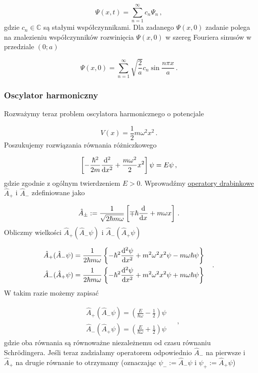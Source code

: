 \documentclass{myclass}
\begin{document}
\begin{equation*}
    \Psi(x,t)=\sum_{n=1}^\infty c_n\Psi_n\,,
\end{equation*}
gdzie \(c_n\in\mathbb{C}\) są stałymi współczynnikami. Dla zadanego \(\Psi(x,0)\) zadanie polega na
znalezieniu współczynników rozwinięcia \(\Psi(x,0)\) w szereg Fouriera sinusów w przedziale
\((0;a)\)

\begin{equation*}
    \Psi(x,0)=\sum_{n=1}^\infty \sqrt{\frac{2}{a}}c_n\sin\frac{n\pi x}{a}\,.
\end{equation*}

\subsubsection{Oscylator harmoniczny}

Rozważymy teraz problem oscylatora harmonicznego o potencjale

\begin{equation*}
    V(x)=\frac{1}{2}m\omega^2x^2\,.
\end{equation*}
Poszukujemy rozwiązania równania różniczkowego

\begin{equation*}
    \left[-\frac{\hbar^2}{2m}\dv[2]{}{x}+\frac{m\omega^2}{2}x^2\right]\psi=E\psi\,,
\end{equation*}
gdzie zgodnie z ogólnym twierdzeniem \(E>0\). Wprowadźmy \underline{operatory drabinkowe}
\(\hat{A}_+\) i \(\hat{A}_-\) zdefiniowane jako

\begin{equation*}
    \hat{A}_\pm:=\frac{1}{\sqrt{2\hbar m\omega}}\left[\mp\hbar\dv[]{}{x}+m\omega x\right]\,.
\end{equation*}
Obliczmy wielkości \(\hat{A}_+(\hat{A}_-\psi)\) i \(\hat{A}_-(\hat{A}_+\psi)\)

\begin{equation*}
\begin{split}
        &\hat{A}_+(\hat{A}_-\psi)=\frac{1}{2\hbar m\omega}\left\{-\hbar^2\dv[2]{\psi}{x}+m^2\omega^2 x^2\psi-m\omega\hbar \psi\right\}\\
        &\hat{A}_-(\hat{A}_+\psi)=\frac{1}{2\hbar m\omega}\left\{-\hbar^2\dv[2]{\psi}{x}+m^2\omega^2 x^2\psi+m\omega\hbar \psi\right\}
\end{split}\quad\,.
\end{equation*}
W takim razie możemy zapisać

\begin{equation*}
\begin{split}
    &\hat{A}_+(\hat{A}_-\psi)=\left(\frac{E}{\hbar\omega}-\frac{1}{2}\right)\psi\\
    &\hat{A}_-(\hat{A}_+\psi)=\left(\frac{E}{\hbar\omega}+\frac{1}{2}\right)\psi
\end{split}\quad\,,
\end{equation*}
gdzie oba równania są równoważne niezależnemu od czasu równaniu Schr{\"o}dingera. Jeśli teraz
zadziałamy operatorem odpowiednio \(\hat{A}_-\) na pierwsze i \(\hat{A}_+\) na drugie równanie to
otrzymamy (oznaczając \(\psi_-:=\hat{A}_-\psi\) i \(\psi_+:=\hat{A}_+\psi\))
\end{document}
